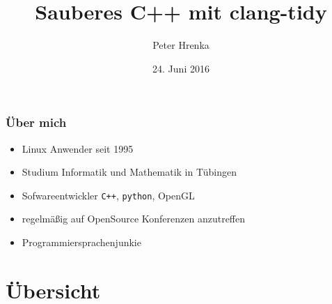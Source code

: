 \documentclass[aspectratio=169]{beamer}
\title{Sauberes C++ mit clang-tidy}
\institute{Linux Tag Tübingen 2017}
\author{Peter Hrenka}
\date{24. Juni 2016}
\begin{document}
\begin{frame}
\titlepage
\end{frame}
\begin{frame}
  \frametitle{Über mich}
  \begin{itemize}
    \item Linux Anwender seit 1995
    \item Studium Informatik und Mathematik in Tübingen
    \item Sofwareentwickler \texttt{C++}, \texttt{python}, OpenGL
    \item regelmäßig auf OpenSource Konferenzen anzutreffen
    \item Programmiersprachenjunkie
  \end{itemize}
\end{frame}
\section*{Übersicht}
\begin{frame}
  \tableofcontents
\end{frame}
\end{document}

